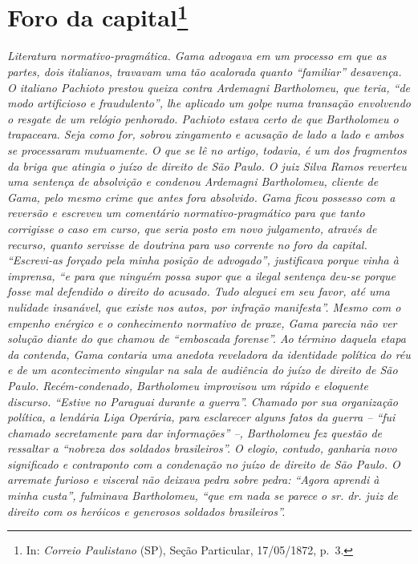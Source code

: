 {\chapter{Foro da capital\footnote{ In: \emph{Correio Paulistano} (SP), Seção Particular,
  17/05/1872, p.~3.}} %

\begin{didascalia}
\emph{Literatura normativo-pragmática. Gama advogava em um processo em
que as partes, dois italianos, travavam uma tão acalorada quanto
``familiar'' desavença. O italiano Pachioto prestou queixa contra
Ardemagni Bartholomeu, que teria, ``de modo artificioso e fraudulento'',
lhe aplicado um golpe numa transação envolvendo o resgate de um relógio
penhorado. Pachioto estava certo de que Bartholomeu o trapaceara. Seja
como for, sobrou xingamento e acusação de lado a lado e ambos se
processaram mutuamente. O que se lê no artigo, todavia, é um dos
fragmentos da briga que atingia o juízo de direito de São Paulo. O juiz
Silva Ramos reverteu uma sentença de absolvição e condenou Ardemagni
Bartholomeu, cliente de Gama, pelo mesmo crime que antes fora absolvido.
Gama ficou possesso com a reversão e escreveu um comentário
normativo-pragmático para que tanto corrigisse o caso em curso, que
seria posto em novo julgamento, através de recurso, quanto servisse de
doutrina para uso corrente no foro da capital. ``Escrevi-as forçado pela
minha posição de advogado'', justificava porque vinha à imprensa, ``e para
que ninguém possa supor que a ilegal sentença deu-se porque fosse mal
defendido o direito do acusado. Tudo aleguei em seu favor, até uma
nulidade insanável, que existe nos autos, por infração manifesta''. Mesmo
com o empenho enérgico e o conhecimento normativo de praxe, Gama parecia
não ver solução diante do que chamou de ``emboscada forense''. Ao término
daquela etapa da contenda, Gama contaria uma anedota reveladora da
identidade política do réu e de um acontecimento singular na sala de
audiência do juízo de direito de São Paulo. Recém-condenado, Bartholomeu
improvisou um rápido e eloquente discurso. ``Estive no Paraguai durante a
guerra''. Chamado por sua organização política, a lendária Liga Operária,
para esclarecer alguns fatos da guerra -- ``fui chamado secretamente para
dar informações'' --, Bartholomeu fez questão de ressaltar a ``nobreza dos
soldados brasileiros''. O elogio, contudo, ganharia novo significado e
contraponto com a condenação no juízo de direito de São Paulo. O
arremate furioso e visceral não deixava pedra sobre pedra: ``Agora
aprendi à minha custa'', fulminava Bartholomeu, ``que em nada se parece o
sr. dr. juiz de direito com os heróicos e generosos soldados
brasileiros''.}
\end{didascalia}

}
